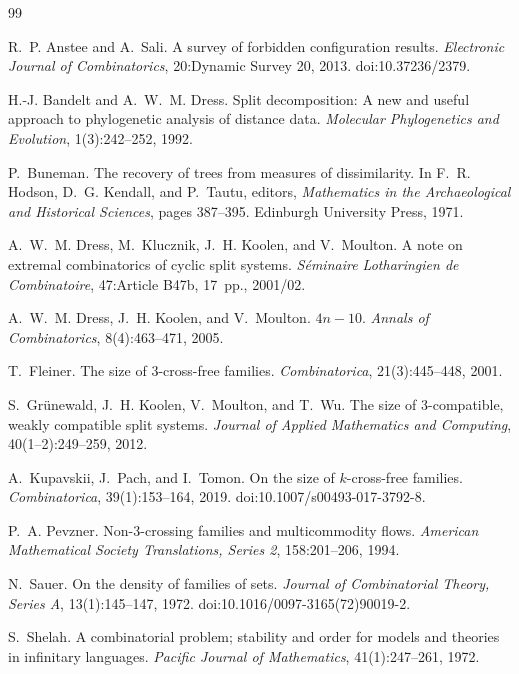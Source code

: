 \documentclass[11pt]{article}
\begin{document}
	\begin{thebibliography}{99}
		
		R.~P. Anstee and A.~Sali.
		A survey of forbidden configuration results.
		\emph{Electronic Journal of Combinatorics}, 20:Dynamic Survey 20, 2013.
		\newblock doi:10.37236/2379.
		
		H.-J. Bandelt and A.~W.~M. Dress.
		Split decomposition: A new and useful approach to phylogenetic analysis of distance data.
		\emph{Molecular Phylogenetics and Evolution}, 1(3):242--252, 1992.
		
		P.~Buneman.
		The recovery of trees from measures of dissimilarity.
		In F.~R. Hodson, D.~G. Kendall, and P.~Tautu, editors,
		\emph{Mathematics in the Archaeological and Historical Sciences}, pages 387--395.
		Edinburgh University Press, 1971.
		
		A.~W.~M. Dress, M.~Klucznik, J.~H. Koolen, and V.~Moulton.
		A note on extremal combinatorics of cyclic split systems.
		\emph{S\'eminaire Lotharingien de Combinatoire}, 47:Article B47b, 17~pp., 2001/02.
		
		A.~W.~M. Dress, J.~H. Koolen, and V.~Moulton.
		$4n-10$.
		\emph{Annals of Combinatorics}, 8(4):463--471, 2005.
		
		T.~Fleiner.
		The size of 3-cross-free families.
		\emph{Combinatorica}, 21(3):445--448, 2001.
		
		S.~Gr\"unewald, J.~H. Koolen, V.~Moulton, and T.~Wu.
		The size of 3-compatible, weakly compatible split systems.
		\emph{Journal of Applied Mathematics and Computing}, 40(1--2):249--259, 2012.
		
		A.~Kupavskii, J.~Pach, and I.~Tomon.
		On the size of $k$-cross-free families.
		\emph{Combinatorica}, 39(1):153--164, 2019.
		\newblock doi:10.1007/s00493-017-3792-8.
		
		P.~A. Pevzner.
		Non-3-crossing families and multicommodity flows.
		\emph{American Mathematical Society Translations, Series 2}, 158:201--206, 1994.
		
		N.~Sauer.
		On the density of families of sets.
		\emph{Journal of Combinatorial Theory, Series A}, 13(1):145--147, 1972.
		\newblock doi:10.1016/0097-3165(72)90019-2.
		
		S.~Shelah.
		A combinatorial problem; stability and order for models and theories in infinitary languages.
		\emph{Pacific Journal of Mathematics}, 41(1):247--261, 1972.
		

\end{thebibliography}
\end{document}
